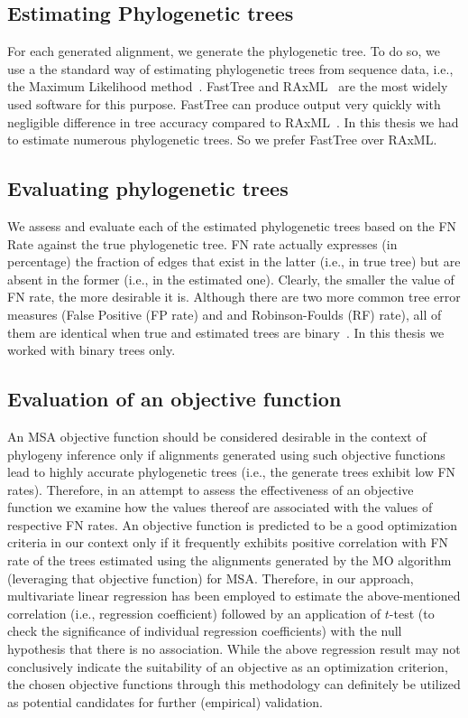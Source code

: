 \subsection{Estimating Phylogenetic trees}
\label{sec:tree_estimation}
For each generated alignment, we generate the phylogenetic tree. To do so, we use a the standard way of estimating phylogenetic trees from sequence data, i.e., the Maximum Likelihood  method~\cite{liu2011raxml}. FastTree\citep{price2010fasttree} and RAxML~\citep{stamatakis2014raxml} are the most widely used software for this purpose. FastTree can produce output very quickly with negligible difference in tree accuracy compared to RAxML~\cite{liu2011raxml}. In this thesis we had to estimate numerous phylogenetic trees. So we prefer FastTree over RAxML.\subsection{Evaluating phylogenetic trees}
\label{sec:tree_eval}
We assess and evaluate each of the estimated phylogenetic trees based on the FN Rate against the true phylogenetic tree. 
FN rate actually expresses (in percentage) the fraction of edges that exist in the latter (i.e., in true tree) but are absent in the former (i.e., in the estimated one). Clearly, the smaller the value of FN rate, the more desirable it is. Although there are two more common tree error measures (False Positive (FP rate) and and Robinson-Foulds (RF) rate), all of them are identical when true and estimated trees are binary~\citep{warnow2017computational}. In this thesis we worked with binary trees only.\subsection{Evaluation of an objective function}
\label{sec:obj_eval}
An MSA objective function should be considered desirable in the context of phylogeny inference only if alignments generated using such objective functions lead to highly accurate phylogenetic trees (i.e., the generate trees exhibit low FN rates).     
Therefore, in an attempt to assess the effectiveness of an objective function we examine how the values thereof are associated with the values of respective FN rates. An objective function is predicted to be a good optimization criteria in our context only if it frequently exhibits positive correlation with FN rate of the trees estimated using the alignments generated by the MO algorithm (leveraging that objective function) for MSA.   
Therefore, in our approach, multivariate linear regression has been employed to estimate the above-mentioned correlation (i.e., regression coefficient) followed by an application of $t$-test (to check the significance of individual regression coefficients) with the null hypothesis that there is no association. While the above regression result may not conclusively indicate the suitability of an objective as an optimization criterion, the chosen objective functions through this methodology can definitely be utilized as potential candidates for further (empirical) validation.


